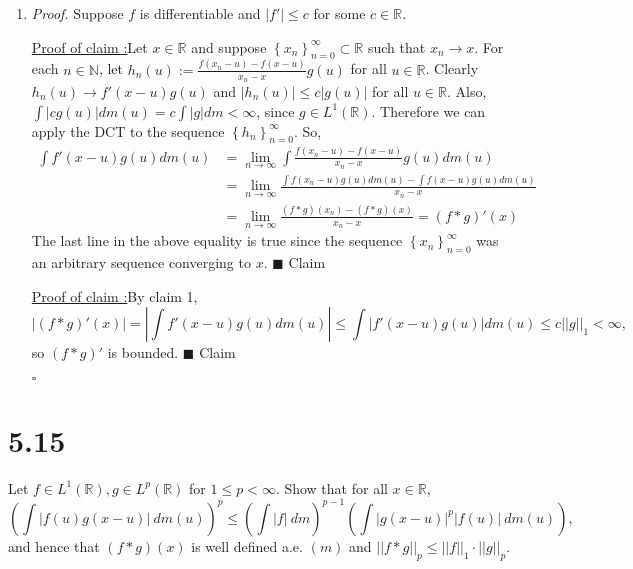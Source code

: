 \documentclass[12pt]{article}
\newcounter{ProofCounter}
\newcounter{ClaimCounter}[ProofCounter]
\newenvironment{Proof}{\stepcounter{ProofCounter}\textit{Proof.}}{\hfill$\square$}
\newenvironment{claim}[1]{\vspace{3mm}\stepcounter{ClaimCounter}\par\noindent\underline{\bf Claim \theClaimCounter:}\space#1}{}
\newenvironment{claimproof}[1]{\par\noindent\underline{Proof of claim \theClaimCounter:}\space#1}{\hfill $\blacksquare$ Claim \theClaimCounter}
\begin{document}
\begin{enumerate}[label=(\alph*)]
\item 
\begin{Proof}
Suppose $f$ is differentiable and $|f'| \leq c$ for some $c \in \mathbb{R}$. 
\begin{claimproof}
Let $x \in \mathbb{R}$ and suppose $\left\{ x_{n}
\right\}_{n=0}^{\infty} \subset \mathbb{R}$ such that $x_{n} \rightarrow x$. For each $n \in \mathbb{N}$, let $h_{n}(u) := \frac{f(x_{n} -u) -
f(x-u)}{x_{n} - x}g(u)$ for all $u \in \mathbb{R}$. Clearly $h_{n}(u) \rightarrow f'(x-u)g(u)$ and $|h_{n}(u)| \leq c|g(u)|$ for all $u \in
\mathbb{R}$. Also, $\int |cg(u)|dm(u) = c \int |g|dm < \infty$,
since $g \in L^{1}(\mathbb{R})$. Therefore we can apply the DCT to the sequence $\left\{ h_{n} \right\}_{n=0}^{\infty}$. So,
\begin{align*}
\int f'(x-u)g(u)dm(u) & = \lim_{n\rightarrow\infty}\int \frac{f(x_{n} - u) - f(x-u)}{x_{n} - x}g(u)dm(u) \\
& = \lim_{n\rightarrow\infty} \frac{ \int f(x_{n} - u)g(u)dm(u) - \int f(x-u)g(u)dm(u)}{x_{n} - x} \\
& = \lim_{n\rightarrow\infty}\frac{ (f*g)(x_{n}) - (f*g)(x) }{x_{n} - x}  = (f*g)'(x)
\end{align*}
The last line in the above equality is true since the sequence $\left\{ x_{n} \right\}_{n=0}^{\infty}$ was an arbitrary sequence converging to $x$.
\end{claimproof}

\begin{claimproof}
By claim 1, 
\[ |(f*g)'(x)| = \left| \int f'(x-u)g(u)dm(u)\right| \leq \int |f'(x-u)g(u)|dm(u) \leq c ||g||_{1} < \infty, \]
so $(f*g)'$ is bounded.
\end{claimproof}

\end{Proof}

\end{enumerate}














\newpage 
\section*{5.15}
Let $f \in L^{1}(\mathbb{R}), g \in L^{p}(\mathbb{R})$ for $1 \leq p < \infty$. Show that for all $x \in \mathbb{R}$,
\[ \left( \int |f(u)g(x-u)|\ dm(u) \right)^{p} \leq \left( \int |f|\ dm \right)^{p-1}\left( \int |g(x-u)|^{p}|f(u)|\ dm(u) \right), \]
and hence that $(f*g)(x)$ is well defined a.e. $(m)$ and $||f*g||_{p} \leq ||f||_{1}\cdot ||g||_{p}$.
\end{document}
